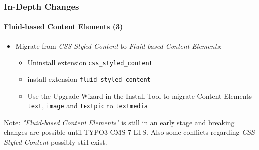 \begin{frame}[fragile]
	\frametitle{In-Depth Changes}
	\framesubtitle{Fluid-based Content Elements (3)}

	\begin{itemize}

		\item Migrate from \textit{CSS Styled Content} to \textit{Fluid-based Content Elements}:

			\begin{itemize}

				\item Uninstall extension \texttt{css\_styled\_content}

				\item install extension \texttt{fluid\_styled\_content}

				\item Use the Upgrade Wizard in the Install Tool to migrate Content Elements
					\texttt{text}, \texttt{image} and \texttt{textpic} to \texttt{textmedia}

			\end{itemize}
	\end{itemize}

	\vspace{1.4cm}

	\begingroup
		\color{red}
			\small
				\underline{Note:} \textit{"Fluid-based Content Elements"} is still in an early stage
				and breaking changes are possible until TYPO3 CMS 7 LTS.
				Also some conflicts regarding \textit{CSS Styled Content} possibly still exist.
			\normalsize
	\endgroup

\end{frame}



